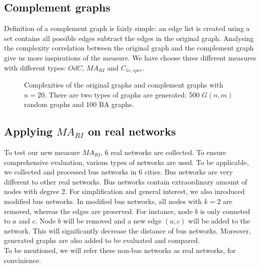 \documentclass[12pt]{article}
\begin{document}
\subsection{Complement graphs}
Definition of a complement graph is fairly simple: an edge list is created using a set contains all possible edges subtract the edges in the original graph. Analysing the complexity correlation between the original graph and the complement graph give us more inspirations of the measure. We have choose three different measures with different types: $OdC$, $MA_{RI}$ and $C_{1e,spec}$.
\begin{figure}[h!]
    \caption{Complexities of the original graphs and complement graphs with $n=20$. There are two types of graphs are generated: 500 $G(n,m)$ random graphs and 100 BA graphs.}
    \label{fig:complement}
\end{figure}

\subsection{Applying $MA_{RI}$ on real networks}
To test our new measure $MA_{RI}$, 6 real networks are collected. To ensure comprehensive evaluation, various types of networks are used. To be applicable, we collected and processed bus networks in 6 cities. Bus networks are very different to other real networks. Bus networks contain extraordinary amount of nodes with degree 2. For simplification and general interest, we also inroduced modified bus networks. In modified bus networks, all nodes with $k=2$ are removed, whereas the edges are preserved. For instance, node $b$ is only conneted to $a$ and $c$. Node $b$ will be removed and a new edge $(a,c)$ will be added to the network. This will significantly decrease the distance of bus networks. Moreover, generated graphs are also added to be evaluated and compared.\\
To be mentioned, we will refer these non-bus networks as real networks, for convinience.
\end{document}
